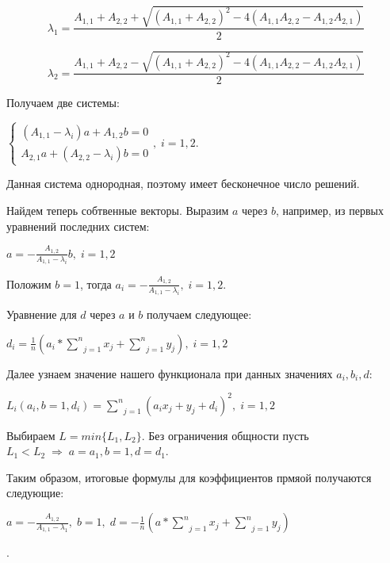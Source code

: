 $$\lambda_1 = \frac{A_{1,1}+A_{2,2} + \sqrt{(A_{1,1}+A_{2,2})^2-4 (A_{1,1} A_{2,2} - A_{1,2} A_{2,1})}}{2}$$

$$\lambda_2 = \frac{A_{1,1}+A_{2,2} - \sqrt{(A_{1,1}+A_{2,2})^2-4 (A_{1,1} A_{2,2} - A_{1,2} A_{2,1})}}{2}$$

\newpage
Получаем две системы:

\begin{center}
	$\begin{cases}
		(A_{1,1} - \lambda_i) a + A_{1,2} b = 0 \\
		A_{2,1} a + (A_{2,2} - \lambda_i) b = 0
	\end{cases},\;i=1,2.$
\end{center}

Данная система однородная, поэтому имеет бесконечное число решений.

Найдем теперь собтвенные векторы. Выразим $a$ через $b$, например, из первых уравнений последних систем:

\begin{center}
	$a = -\frac{A_{1,2}}{A_{1,1}-\lambda_i}b,\;i=1,2$
\end{center}

Положим $b = 1$, тогда $a_i = -\frac{A_{1,2}}{A_{1,1}-\lambda_i},\;i=1,2$.

Уравнение для $d$ через $a$ и $b$ получаем следующее:

\begin{center}
	$d_i = \frac{1}{n}(a_i * \underset{j=1}{\overset{n}{\sum}}x_j + \underset{j=1}{\overset{n}{\sum}}y_j),\;i=1,2$
\end{center}

Далее узнаем значение нашего функционала при данных значениях $a_i, b_i, d$:

\begin{center}
	$L_i (a_i, b = 1, d_i)= \underset{j=1}{\overset{n}{\sum}}(a_i x_j+ y_j + d_i)^2,\;i=1,2$
\end{center}

Выбираем $L = min \{L_1, L_2\}$. Без ограничения общности пусть $L_1 < L_2 \; \Rightarrow \; a = a_1, b = 1, d = d_1$.

Таким образом, итоговые формулы для коэффициентов прмяой получаются следующие:

\begin{center}
	$a = -\frac{A_{1,2}}{A_{1,1}-\lambda_1}, \; b =1, \; d = -\frac{1}{n}(a * \underset{j=1}{\overset{n}{\sum}}x_j + \underset{j=1}{\overset{n}{\sum}}y_j)$
\end{center}.

